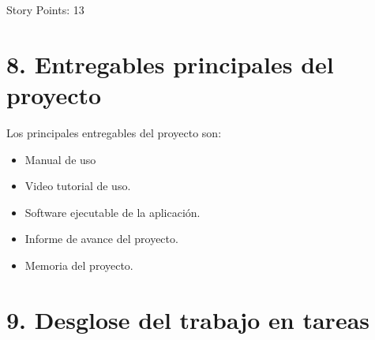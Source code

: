 \documentclass[
11pt, %
]{charter}
\begin{document}
Story Points: 13
\section{8. Entregables principales del proyecto}
\label{sec:entregables}


Los principales entregables del proyecto son:

\begin{itemize}
	\item Manual de uso 
	\item Video tutorial de uso.
	\item Software ejecutable de la aplicación.
	\item Informe de avance del proyecto.
	\item Memoria del proyecto.
\end{itemize}


\section{9. Desglose del trabajo en tareas}
\label{sec:wbs}
\end{document}
